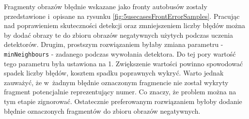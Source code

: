 Fragmenty obrazów błędnie wskazane jako fronty autobusów zostały przedstawione i~opisane na rysunku \ref{fig:5usecasesFrontErrorSamples}.
Pracując nad poprawieniem skuteczności detekcji oraz
zmniejszeniem liczby błędów można by dodać obrazy te do zbioru
obrazów negatywnych użytych podczas uczenia detektorów.
Drugim, prostszym rozwiązaniem byłaby zmiana parametru -
\verb|minNeighbours| - zadanego podczas wywołania detektora.
Do tej pory wartość tego parametru była ustawiona na 1. Zwiększenie
wartości powinno spowodować spadek liczby błędów, kosztem
spadku poprawnych wykryć. Warto jednak zauważyć, że 
w~żadnym błędnie oznaczonym fragmencie nie został wykryty 
fragment potencjalnie reprezentujący numer. Co znaczy, że problem można
na tym etapie zignorować. Ostatecznie preferowanym rozwiązaniem byłoby
dodanie błędnie oznaczonych fragmentów do zbioru obrazów negatywnych.

